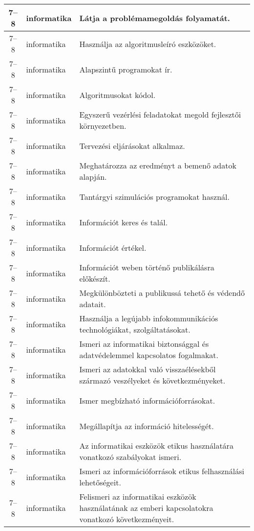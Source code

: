 \begin{small}
\begin{longtable}{c | p{2cm} |  p{11cm} }
              7--8 & informatika & Látja a problémamegoldás folyamatát. \\ \hline
              7--8 & informatika & Használja az algoritmusleíró eszközöket. \\ \hline
              7--8 & informatika & Alapszintű programokat ír. \\ \hline
              7--8 & informatika & Algoritmusokat kódol. \\ \hline
              7--8 & informatika & Egyszerű vezérlési feladatokat megold fejlesztői környezetben. \\ \hline
              7--8 & informatika & Tervezési eljárásokat alkalmaz. \\ \hline
              7--8 & informatika & Meghatározza az eredményt a bemenő adatok alapján. \\ \hline
              7--8 & informatika & Tantárgyi szimulációs programokat használ. \\ \hline
              7--8 & informatika & Információt keres és talál. \\ \hline
              7--8 & informatika & Információt értékel. \\ \hline
              7--8 & informatika & Információt weben történő publikálásra előkészít. \\ \hline
              7--8 & informatika & Megkülönbözteti a publikussá tehető és védendő adatait. \\ \hline
              7--8 & informatika & Használja a legújabb infokommunikációs technológiákat, szolgáltatásokat. \\ \hline
              7--8 & informatika & Ismeri az informatikai biztonsággal és adatvédelemmel kapcsolatos fogalmakat. \\ \hline
              7--8 & informatika & Ismeri az adatokkal való visszaélésekből származó veszélyeket és következményeket. \\ \hline
              7--8 & informatika & Ismer megbízható információforrásokat. \\ \hline
              7--8 & informatika & Megállapítja az információ hitelességét. \\ \hline
              7--8 & informatika & Az informatikai eszközök etikus használatára vonatkozó szabályokat ismeri. \\ \hline
              7--8 & informatika & Ismeri az információforrások etikus felhasználási lehetőségeit. \\ \hline
              7--8 & informatika & Felismeri az informatikai eszközök használatának az emberi kapcsolatokra vonatkozó következményeit. \\ \hline

\end{longtable}
\end{small}
